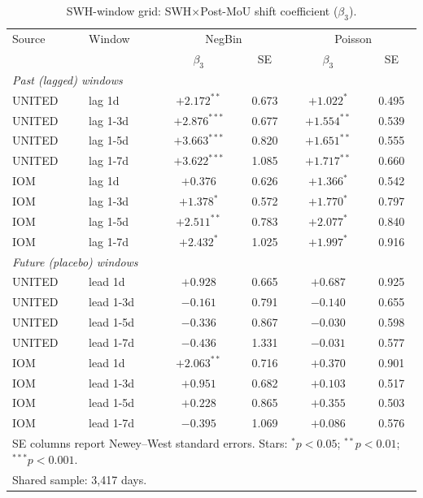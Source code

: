 \begin{table}[h!]
\centering
\small
\caption{SWH-window grid: SWH$\times$Post-MoU shift coefficient ($\beta_3$).}
\label{tab:appx-exposure}
\begin{tabular}{llcccc}
\hline
Source & Window      & \multicolumn{2}{c}{NegBin} & \multicolumn{2}{c}{Poisson} \\
       &             & $\beta_3$ & SE    & $\beta_3$ & SE \\
\hline
\multicolumn{6}{l}{\textit{Past (lagged) windows}} \\
UNITED  & lag 1d      & $+2.172^{**}$   & 0.673 & $+1.022^{*}$    & 0.495 \\
UNITED  & lag 1-3d    & $+2.876^{***}$  & 0.677 & $+1.554^{**}$   & 0.539 \\
UNITED  & lag 1-5d    & $+3.663^{***}$  & 0.820 & $+1.651^{**}$   & 0.555 \\
UNITED  & lag 1-7d    & $+3.622^{***}$  & 1.085 & $+1.717^{**}$   & 0.660 \\
IOM     & lag 1d      & $+0.376$        & 0.626 & $+1.366^{*}$    & 0.542 \\
IOM     & lag 1-3d    & $+1.378^{*}$    & 0.572 & $+1.770^{*}$    & 0.797 \\
IOM     & lag 1-5d    & $+2.511^{**}$   & 0.783 & $+2.077^{*}$    & 0.840 \\
IOM     & lag 1-7d    & $+2.432^{*}$    & 1.025 & $+1.997^{*}$    & 0.916 \\
\multicolumn{6}{l}{\textit{Future (placebo) windows}} \\
UNITED  & lead 1d     & $+0.928$        & 0.665 & $+0.687$        & 0.925 \\
UNITED  & lead 1-3d   & $-0.161$        & 0.791 & $-0.140$        & 0.655 \\
UNITED  & lead 1-5d   & $-0.336$        & 0.867 & $-0.030$        & 0.598 \\
UNITED  & lead 1-7d   & $-0.436$        & 1.331 & $-0.031$        & 0.577 \\
IOM     & lead 1d     & $+2.063^{**}$   & 0.716 & $+0.370$        & 0.901 \\
IOM     & lead 1-3d   & $+0.951$        & 0.682 & $+0.103$        & 0.517 \\
IOM     & lead 1-5d   & $+0.228$        & 0.865 & $+0.355$        & 0.503 \\
IOM     & lead 1-7d   & $-0.395$        & 1.069 & $+0.086$        & 0.576 \\
\hline
\multicolumn{6}{l}{\footnotesize SE columns report Newey--West standard errors. Stars: $^{*}p<0.05$; $^{**}p<0.01$; $^{***}p<0.001$.} \\
\multicolumn{6}{l}{\footnotesize Shared sample: 3,417 days.}
\end{tabular}
\end{table}

